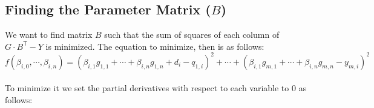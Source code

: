 \documentclass[12pt]{amsart}
\theoremstyle{plain}
\theoremstyle{definition}
\begin{document}



\subsection{Finding the Parameter Matrix ($B$)}

We want to find matrix $B$ such that the sum of squares of each column of $G\cdot B^\mathsf{T} - Y$ is minimized.
The equation to minimize, then is as follows:
$$ f(\beta_{i,0},\cdots,\beta_{i,n}) = (\beta_{i,1}g_{1,1}+\cdots+\beta_{i,n}g_{1,n} + d_i - q_{1,i})^2 + \cdots + (\beta_{i,1}g_{m,1}+\cdots+\beta_{i,n}g_{m,n} - y_{m,i})^2 $$\\
To minimize it we set the partial derivatives with respect to each variable to $0$ as follows:
\end{document}
